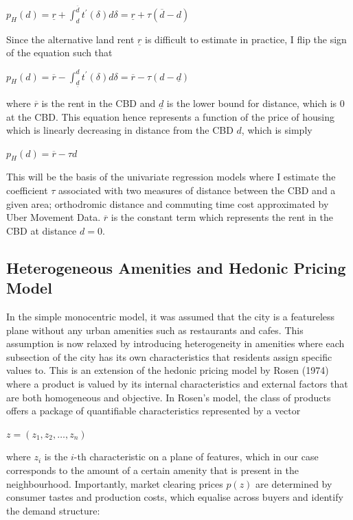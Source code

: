 \documentclass{article}
\begin{document}
\begin{center}
$p _ { H } ( d ) = \underline { r } + \int _ { d } ^ { \overline { d } } t ^ { \prime } ( \delta ) d \delta = \underline { r } + \tau ( \overline { d } - d )$
\end{center}
Since the alternative land rent $\underline{r}$ is difficult to estimate in practice, I flip the sign of the equation such that 
\begin{center}
$p _ { H } ( d ) = \overline { r } - \int _ { \underline { d } } ^ { d } t ^ { \prime } ( \delta ) d \delta = \overline { r } - \tau ( d - \underline { d } )$
\end{center}
where $\overline{r}$ is the rent in the CBD and $\underline{d}$ is the lower bound for distance, which is 0 at the CBD. This equation hence represents a function of the price of housing which is linearly decreasing in distance from the CBD $d$, which is simply
\begin{center}
$p _ { H } ( d ) = \overline { r } - \tau d$
\end{center}
This will be the basis of the univariate regression models where I estimate the coefficient $\tau$ associated with two measures of distance between the CBD and a given area; orthodromic distance and commuting time cost approximated by Uber Movement Data. $\overline{r}$ is the constant term which represents the rent in the CBD at distance $d = 0$.

\subsection{Heterogeneous Amenities and Hedonic Pricing Model}
In the simple monocentric model, it was assumed that the city is a featureless plane without any urban amenities such as restaurants and cafes. This assumption is now relaxed by introducing heterogeneity in amenities where each subsection of the city has its own characteristics that residents assign specific values to. This is an extension of the hedonic pricing model by Rosen (1974) where a product is valued by its internal characteristics and external factors that are both homogeneous and objective. In Rosen's model, the class of products offers a package of quantifiable characteristics represented by a vector 

\begin{center}
    $z = \left( z _ { 1 } , z _ { 2 } , \dots , z _ { n } \right)$
\end{center}

where $z_i$ is the $i$-th characteristic on a plane of features, which in our case corresponds to the amount of a certain amenity that is present in the neighbourhood. Importantly, market clearing prices $p(z)$ are determined by consumer tastes and production costs, which equalise across buyers and identify the demand structure:
\end{document}
